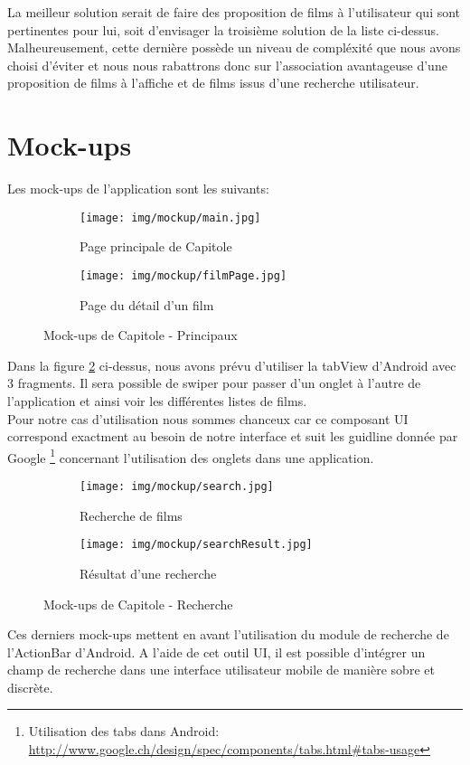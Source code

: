 La meilleur solution serait de faire des proposition de films à l'utilisateur qui sont pertinentes pour lui, soit d'envisager la troisième solution de la liste ci-dessus. Malheureusement, cette dernière possède un niveau de compléxité que nous avons choisi d'éviter et nous nous rabattrons donc sur l'association avantageuse d'une proposition de films à l'affiche et de films issus d'une recherche utilisateur.

\section{Mock-ups}

Les mock-ups de l'application sont les suivants:

\begin{figure}[H]
    \begin{subfigure}[b]{.5\linewidth}
        \centering
            \texttt{[image: img/mockup/main.jpg]}
            \caption{Page principale de Capitole}
            \label{tasklist}
    \end{subfigure}
    \begin{subfigure}[b]{.5\linewidth}
        \centering
            \texttt{[image: img/mockup/filmPage.jpg]}
            \caption{Page du détail d'un film}
    \end{subfigure}
    \caption{Mock-ups de Capitole - Principaux}
    \label{mockup1}
\end{figure}

Dans la figure \ref{mockup1} ci-dessus, nous avons prévu d'utiliser la tabView d'Android avec 3 fragments. Il sera possible de swiper pour passer d'un onglet à l'autre de l'application et ainsi voir les différentes listes de films.\\

Pour notre cas d'utilisation nous sommes chanceux car ce composant UI correspond exactment au besoin de notre interface et suit les guidline donnée par Google \footnote{Utilisation des tabs dans Android: \url{http://www.google.ch/design/spec/components/tabs.html\#tabs-usage}} concernant l'utilisation des onglets dans une application.

\begin{figure}[H]
    \begin{subfigure}[b]{.5\linewidth}
        \centering
            \texttt{[image: img/mockup/search.jpg]}
            \caption{Recherche de films}
            \label{tasklist}
    \end{subfigure}
    \begin{subfigure}[b]{.5\linewidth}
        \centering
            \texttt{[image: img/mockup/searchResult.jpg]}
            \caption{Résultat d'une recherche}
    \end{subfigure}
    \caption{Mock-ups de Capitole - Recherche}
\end{figure}

Ces derniers mock-ups mettent en avant l'utilisation du module de recherche de l'ActionBar d'Android. A l'aide de cet outil UI, il est possible d'intégrer un champ de recherche dans une interface utilisateur mobile de manière sobre et discrète.








